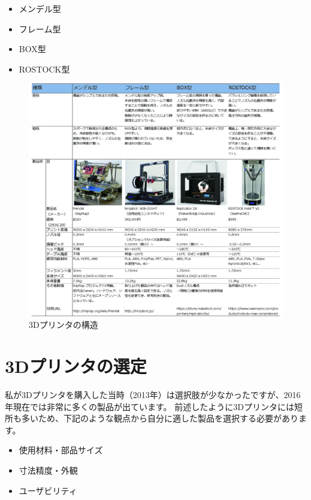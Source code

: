 \begin{itemize}
\tightlist
\item
  メンデル型
\item
  フレーム型
\item
  BOX型
\item
  ROSTOCK型
\end{itemize}

\begin{figure}[htbp]
\centering
\includegraphics[width=380pt]{fig/fig23_cmyk.jpg}
\caption{3Dプリンタの構造}
\label{fig23}
\end{figure}

\section{3Dプリンタの選定}\label{dux30d7ux30eaux30f3ux30bfux306eux9078ux5b9a}

私が3Dプリンタを購入した当時（2013年）は選択肢が少なかったですが、2016年現在では非常に多くの製品が出ています。
前述したように3Dプリンタには短所も多いため、下記のような観点から自分に適した製品を選択する必要があります。

\begin{itemize}
\tightlist
\item
  使用材料・部品サイズ
\item
  寸法精度・外観
\item
  ユーザビリティ
\end{itemize}

